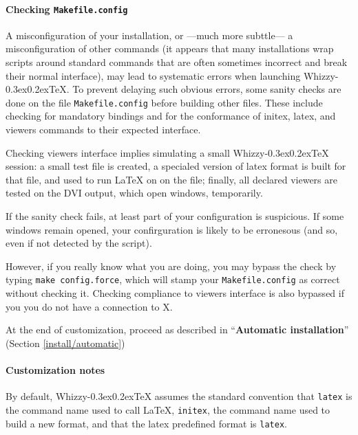 \documentclass[12pt]{article}
\makeatletter
\let \lst \verb
\def \whizzy {{Whizzy\kern -0.3ex\raise 0.2ex\hbox{\let \@\relax\TeX}}}
\makeatother
\begin{document}
\paragraph {Checking {\tt Makefile.config}}

A misconfiguration of your installation, or ---much more subttle--- a
misconfiguration of other commands (it appears that many installations wrap
scripts around standard commands that are often sometimes incorrect and
break their normal interface), may lead to systematic errors when launching
{\whizzy}. To prevent delaying such obvious errors, some sanity checks are
done on the file \lst"Makefile.config" before building other files.
These include checking for mandatory bindings and for the conformance of
initex, latex, and viewers commands to their expected interface.

Checking viewers interface implies simulating a small {\whizzy} session: a
small test file is created, a specialed version of latex format is built for
that file, and used to run {\LaTeX} on on the file; finally, all declared
viewers are tested on the DVI output, which open windows, temporarily.

If the sanity check fails, at least part of your configuration is 
suspicious. If some windows remain opened, your confirguration is likely to
be erronesous (and so, even if not detected by the script).  

However, if you really know what you are doing, you may bypass the check by
typing \lst"make config.force", which will stamp your \lst"Makefile.config"
as correct without checking it. Checking compliance to viewers interface
is also bypassed if you you do not have a connection to X. 

At the end of customization, proceed as described in ``{\bf Automatic
installation}'' (Section \ref {install/automatic})

\paragraph {Customization notes}

By default, {\whizzy} assumes the standard convention that 
\lst"latex" is the command name used to call {\LaTeX}, 
\lst"initex", the command name used to build a new format, and that the latex 
predefined format is \lst"latex".
\end{document}
